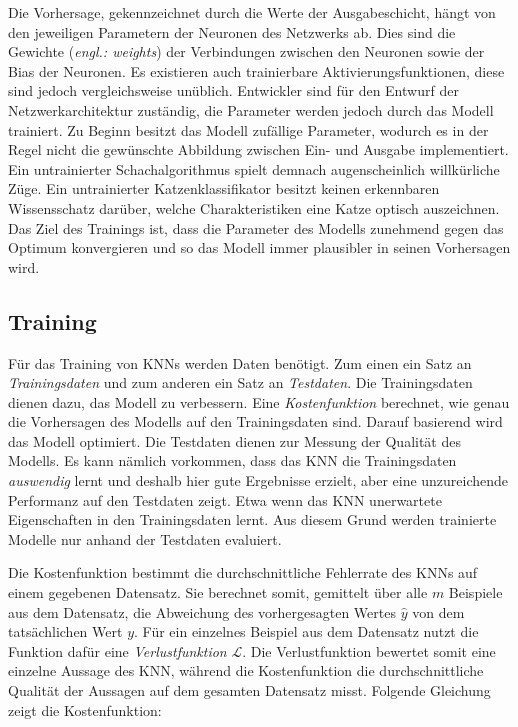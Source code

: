 Die Vorhersage, gekennzeichnet durch die Werte der Ausgabeschicht, hängt von den jeweiligen Parametern der Neuronen des Netzwerks ab. Dies sind die Gewichte (\emph{engl.: weights}) der Verbindungen zwischen den Neuronen sowie der Bias der Neuronen. Es existieren auch trainierbare Aktivierungsfunktionen, diese sind jedoch vergleichsweise unüblich. Entwickler sind für den Entwurf der Netzwerkarchitektur zuständig, die Parameter werden jedoch durch das Modell trainiert. Zu Beginn besitzt das Modell zufällige Parameter, wodurch es in der Regel nicht die gewünschte Abbildung zwischen Ein- und Ausgabe implementiert. Ein untrainierter Schachalgorithmus spielt demnach augenscheinlich willkürliche Züge. Ein untrainierter Katzenklassifikator besitzt keinen erkennbaren Wissensschatz darüber, welche Charakteristiken eine Katze optisch auszeichnen. Das Ziel des Trainings ist, dass die Parameter des Modells zunehmend gegen das Optimum konvergieren und so das Modell immer plausibler in seinen Vorhersagen wird. \cite{knnsKompakt} \cite{visualApproach}

\subsection{Training}
Für das Training von \acp{KNN} werden Daten benötigt. Zum einen ein Satz an \emph{Trainingsdaten} und zum anderen ein Satz an \emph{Testdaten}. Die Trainingsdaten dienen dazu, das Modell zu verbessern. Eine \emph{Kostenfunktion} berechnet, wie genau die Vorhersagen des Modells auf den Trainingsdaten sind. Darauf basierend wird das Modell optimiert. Die Testdaten dienen zur Messung der Qualität des Modells. Es kann nämlich vorkommen, dass das \ac{KNN} die Trainingsdaten \emph{auswendig} lernt und deshalb hier gute Ergebnisse erzielt, aber eine unzureichende Performanz auf den Testdaten zeigt. Etwa wenn das \ac{KNN} unerwartete Eigenschaften in den Trainingsdaten lernt. Aus diesem Grund werden trainierte Modelle nur anhand der Testdaten evaluiert. \cite{knnsKompakt}

Die Kostenfunktion bestimmt die durchschnittliche Fehlerrate des \acp{KNN} auf einem gegebenen Datensatz. Sie berechnet somit, gemittelt über alle $m$ Beispiele aus dem Datensatz, die Abweichung des vorhergesagten Wertes $\hat{y}$ von dem tatsächlichen Wert $y$. Für ein einzelnes Beispiel aus dem Datensatz nutzt die Funktion dafür eine \emph{Verlustfunktion} $\mathcal{L}$. Die Verlustfunktion bewertet somit eine einzelne Aussage des \ac{KNN}, während die Kostenfunktion die durchschnittliche Qualität der Aussagen auf dem gesamten Datensatz misst. Folgende Gleichung zeigt die Kostenfunktion: \cite{DeepLearningBook}

